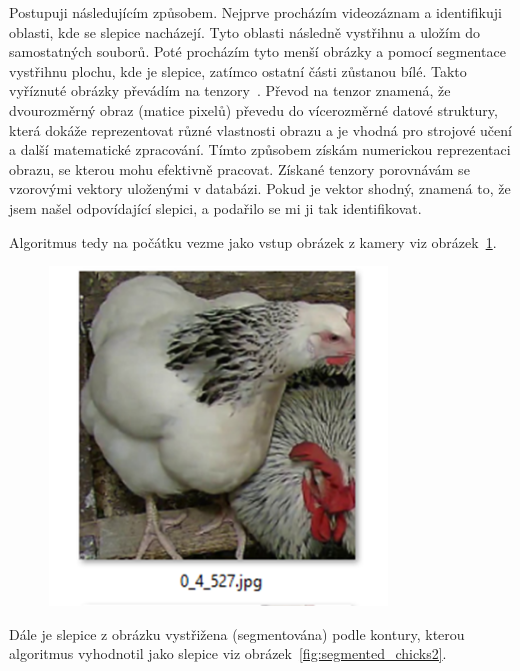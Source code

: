 Postupuji následujícím způsobem.
Nejprve procházím videozáznam a identifikuji oblasti, kde se slepice nacházejí.
Tyto oblasti následně vystřihnu a uložím do samostatných souborů.
Poté procházím tyto menší obrázky a pomocí segmentace vystřihnu plochu, kde je slepice, zatímco ostatní části zůstanou bílé.
Takto vyříznuté obrázky převádím na tenzory~\cite{Tenzor}.
Převod na tenzor znamená, že dvourozměrný obraz (matice pixelů) převedu do vícerozměrné datové struktury, která dokáže reprezentovat různé vlastnosti obrazu a je vhodná pro strojové učení a další matematické zpracování.
Tímto způsobem získám numerickou reprezentaci obrazu, se kterou mohu efektivně pracovat.
Získané tenzory porovnávám se vzorovými vektory uloženými v databázi.
Pokud je vektor shodný, znamená to, že jsem našel odpovídající slepici, a podařilo se mi ji tak identifikovat.

Algoritmus tedy na počátku vezme jako vstup obrázek z kamery viz obrázek~\ref{fig:source_chick_image}.

\begin{figure}[H]
    \centering
    \includegraphics[width=0.8\textwidth]{img/source_chick_image}
    \label{fig:source_chick_image}
\end{figure}

Dále je slepice z obrázku vystřižena (segmentována) podle kontury, kterou algoritmus vyhodnotil jako slepice viz obrázek~\ref{fig:segmented_chicks2}.

